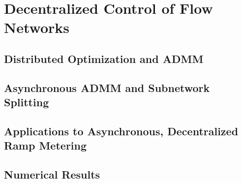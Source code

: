 \section{Decentralized Control of Flow Networks}

\subsection{Distributed Optimization and ADMM}

\subsection{Asynchronous ADMM and Subnetwork Splitting}

\subsection{Applications to Asynchronous, Decentralized Ramp Metering}

\subsection{Numerical Results}